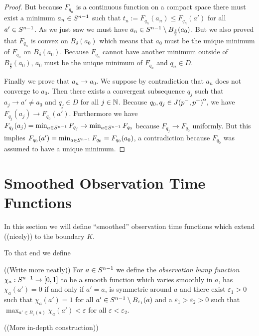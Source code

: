 \begin{proof}
    But because $F_{q_n}$ is a continuous function on a compact space there must exist a minimum $a_n\in {S^{n-1}}$ such that $t_n:=F_{q_n}(a_n)\leq F_{q_n}(a')$ for all $a'\in {S^{n-1}}$. As we just saw we must have $a_n \in {S^{n-1}}\setminus B_{\frac{\delta}{2}}(a_0)$. But we also proved that $F_{q_n}$ is convex on $B_\delta(a_0)$ which means that $a_0$ must be the unique minimum of $F_{q_n}$ on $B_\delta(a_0)$. Because $F_{q_n}$ cannot have another minimum outside of $B_{\frac{\delta}{2}}(a_0)$, $a_0$ must be the unique minimum of $F_{q_n}$ and $q_n \in D$.

    Finally we prove that $a_n\to a_0$. We suppose by contradiction that $a_n$ does not converge to $a_0$. Then there exists a convergent subsequence $q_j$ such that $a_j \to a' \neq a_0$ and $q_j \in D$ for all $j\in \mathbb{N}$. Because $q_0,q_j\in {\kern0ptJ(p^-,p^+)}^{\mathrm{o}}$, we have $F_{q_j}(a_j) \to F_{q_0}(a')$. Furthermore we have $F_{q_j}(a_j)= \min_{a\in {S^{n-1}}}F_{q_j} \to \min_{a\in {S^{n-1}}}F_{q_0}$ because $F_{q_j}\to F_{q_0}$ uniformly. But this implies $F_{q_0}(a') = \min_{a\in {S^{n-1}}}F_{q_0}=F_{q_0}(a_0)$, a contradiction because $F_{q_0}$ was assumed to have a unique minimum.
\end{proof}

\section{Smoothed Observation Time Functions}
In this section we will define \enquote{smoothed} observation time functions which extend ((nicely)) to the boundary $K$.

To that end we define 
\begin{definition}\label{def:obsbumpfn}
    ((Write more neatly))
    For $a\in {S^{n-1}}$ we define the \emph{observation bump function} $\chi_{a}:{S^{n-1}}\to [0,1]$ to be a smooth function which varies smoothly in $a$, has $\chi_a(a')=0$ if and only if $a'=a$, is symmetric around $a$ and there exist $\varepsilon_1>0$ such that $\chi_{a}(a')=1$ for all $a'\in {S^{n-1}}\setminus B_{\varepsilon_1}(a)$ and a $\varepsilon_1 > \varepsilon_2 > 0$ such that $\max_{a'\in B_{\varepsilon}(a)} \chi_a(a')<\varepsilon$ for all $\varepsilon<\varepsilon_2$.
\end{definition}
((More in-depth construction))

